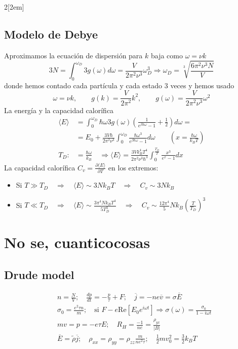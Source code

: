 \documentclass[leqno]{article}
\begin{document}
\begin{multicols}{2}[\columnsep2em]
\subsection{Modelo de Debye}
Aproximamos la ecuación de dispersión para $k$ baja como  $\omega = \nu k$
\[
  3N = \int_0^{\omega _D} 3g(\omega )d\omega = \frac{V}{2\pi^2 \nu^3}\omega _D^3 \Rightarrow \boxed{\omega _D = \sqrt[3]{\frac{6\pi^2\nu^3N}{V}} }
\] 
donde hemos contado cada partícula y cada estado 3 veces y hemos usado
\[
\omega = \nu k, \qquad g(k)=\frac{V}{2\pi^2}k^2, \qquad g(\omega )= \frac{V}{2\pi^2 \nu^3}\omega ^2
\]
La energía y la capacidad calorífica
\begin{align*}
  \langle E \rangle &= \int_0^{\omega _D}\hbar \omega 3g(\omega )\left( \frac{1}{e^{\beta \hbar \omega }-1} +\frac{1}{2} \right) d\omega  =\\
					&=E_0 + \frac{3V\hbar }{2\pi^2\nu^3} \int_0^{\omega _D}\frac{\hbar \omega ^3}{e^{\beta \hbar \omega }-1} d\omega \qquad (x=\frac{\hbar \omega }{k_B T})\\
  T_D :&= \frac{\hbar \omega }{k_B} \quad   \Rightarrow  \boxed{\langle E \rangle = \frac{3Vk_B^4T^4}{2\pi^2\nu^3\hbar ^3}\int_0^{\frac{T_D}{T}}\frac{x^3}{e^x-1}dx }
\end{align*}
La capacidad calorífica $C_v = \frac{\partial \langle E \rangle }{\partial T}$ en los extremos:
\begin{itemize}[topsep=-6pt, itemsep=0pt]
  \item Si $T\gg T_D \quad \Rightarrow \quad \langle E \rangle \sim 3Nk_BT \quad \Rightarrow \quad C_v \sim  3Nk_B $
  \item Si $T\ll T_D \quad \Rightarrow \quad \langle E \rangle \sim  \frac{3\pi^4Nk_BT^4}{5T_D^3}\quad\Rightarrow \quad C_v \sim  \frac{12\pi^4}{5}Nk_B \left( \frac{T}{T_D} \right)^3 $
\end{itemize}

\section{No se, cuanticocosas}
\subsection{Drude model}
\begin{align*}
  &n=\frac{N}{V}; \quad\frac{dp}{dt} = -\frac{p}{\tau}+F; \quad \overline{j} = -ne \overline{v} = \sigma \overline{E}\\
  & \sigma _0 = \frac{e^2\tau n}{m}; \quad \text{si } F -e\text{Re}[E_0e ^{i\omega t}] \Rightarrow \sigma (\omega ) = \frac{\sigma _0}{1-i\omega t}\\
  & mv=p=-e\tau E; \quad R_H = \frac{-1}{ne} = \frac{\rho_{yx}}{|B|}\\
  &\overline{E} = \tilde{\rho }\overline{j}; \quad \rho _{x x} = \rho _{yy}=\rho _{zz} \frac{m}{ne^2\tau }; \quad \frac{1}{2}mv_0^2= \frac{3}{2}k_BT
\end{align*}


\end{multicols}
\end{document}
